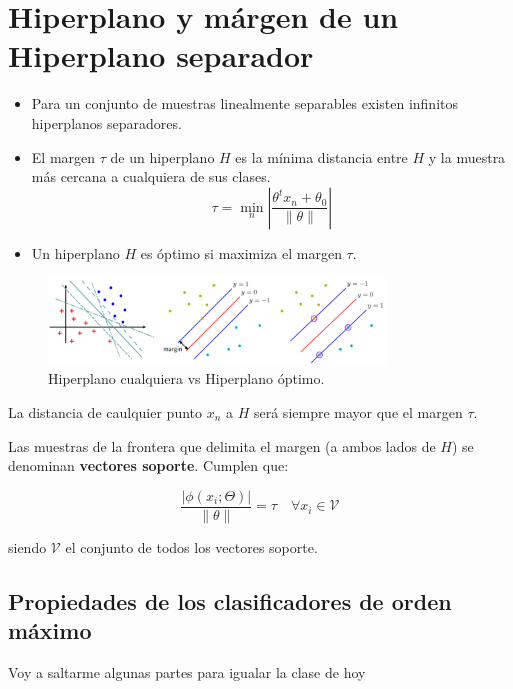 \section{Hiperplano y márgen de un Hiperplano separador}

\begin{itemize}
    \item Para un conjunto de muestras linealmente separables
    existen infinitos hiperplanos separadores.
    \item El margen $\tau$ de un hiperplano $H$ es la mínima distancia
    entre $H$ y la muestra más cercana a cualquiera de sus clases.
    \begin{equation*}
        \tau = \min_{n} \left| \frac{\theta^t x_n + \theta_0}{\|\theta\|} \right|
    \end{equation*}
    \item Un hiperplano $H$ es óptimo si maximiza el margen $\tau$.
\end{itemize}

\begin{figure}[H]
    \centering
    \includegraphics[width=0.8\textwidth]{images/fdl_hiperplano_optimo.png}
    \caption{Hiperplano cualquiera vs Hiperplano óptimo.}
\end{figure}

La distancia de caulquier punto $x_n$ a $H$ será siempre mayor
que el margen $\tau$.

Las muestras de la frontera que delimita el margen (a ambos
lados de $H$) se denominan \textbf{vectores soporte}. Cumplen que:

\begin{equation*}
    \frac{|\phi(x_i; \Theta)|}{\|\theta\|} = \tau \quad \forall x_i \in \mathcal{V}
\end{equation*}

siendo $\mathcal{V}$ el conjunto de todos los vectores soporte.

\subsection{Propiedades de los clasificadores de orden máximo}

Voy a saltarme algunas partes para igualar la clase de hoy

